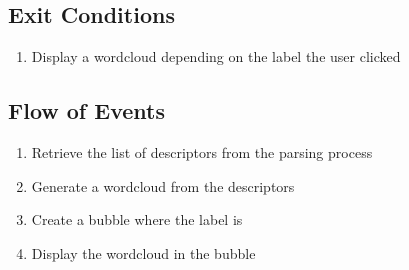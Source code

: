 \documentclass[21pt]{article}
\begin{document}
\subsection{Exit Conditions}
\begin{enumerate}
\item Display a wordcloud depending on the label the user clicked
\end{enumerate}
\subsection{Flow of Events}
\begin{enumerate}
\item Retrieve the list of descriptors from the parsing process
\item Generate a wordcloud from the descriptors
\item Create a bubble where the label is
\item Display the wordcloud in the bubble
\end{enumerate}
\end{document}

